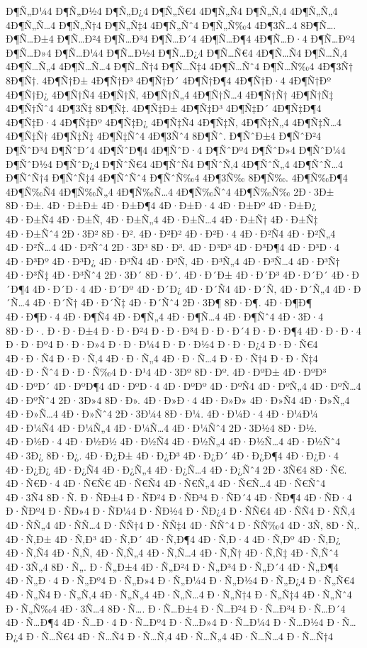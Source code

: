 {Ð¶Ñ„Ð¼4
Ð¶Ñ„Ð½4
Ð¶Ñ„Ð¿4
Ð¶Ñ„Ñ€4
4Ð¶Ñ„Ñ4
Ð¶Ñ„Ñ‚4
4Ð¶Ñ„Ñ„4
4Ð¶Ñ„Ñ…4
Ð¶Ñ„Ñ†4
Ð¶Ñ„Ñ‡4
4Ð¶Ñ„Ñˆ4
Ð¶Ñ„Ñ‰4
4Ð¶3Ñ…4
8Ð¶Ñ….
Ð¶Ñ…Ð±4
Ð¶Ñ…Ð²4
Ð¶Ñ…Ð³4
Ð¶Ñ…Ð´4
4Ð¶Ñ…Ð¶4
4Ð¶Ñ…Ð·4
Ð¶Ñ…Ðº4
Ð¶Ñ…Ð»4
Ð¶Ñ…Ð¼4
Ð¶Ñ…Ð½4
Ð¶Ñ…Ð¿4
Ð¶Ñ…Ñ€4
4Ð¶Ñ…Ñ4
Ð¶Ñ…Ñ‚4
4Ð¶Ñ…Ñ„4
4Ð¶Ñ…Ñ…4
Ð¶Ñ…Ñ†4
Ð¶Ñ…Ñ‡4
4Ð¶Ñ…Ñˆ4
Ð¶Ñ…Ñ‰4
4Ð¶3Ñ†
8Ð¶Ñ†.
4Ð¶Ñ†Ð±
4Ð¶Ñ†Ð³
4Ð¶Ñ†Ð´
4Ð¶Ñ†Ð¶4
4Ð¶Ñ†Ð·4
4Ð¶Ñ†Ðº
4Ð¶Ñ†Ð¿
4Ð¶Ñ†Ñ4
4Ð¶Ñ†Ñ‚
4Ð¶Ñ†Ñ„4
4Ð¶Ñ†Ñ…4
4Ð¶Ñ†Ñ†
4Ð¶Ñ†Ñ‡
4Ð¶Ñ†Ñˆ4
4Ð¶3Ñ‡
8Ð¶Ñ‡.
4Ð¶Ñ‡Ð±
4Ð¶Ñ‡Ð³
4Ð¶Ñ‡Ð´
4Ð¶Ñ‡Ð¶4
4Ð¶Ñ‡Ð·4
4Ð¶Ñ‡Ðº
4Ð¶Ñ‡Ð¿
4Ð¶Ñ‡Ñ4
4Ð¶Ñ‡Ñ‚
4Ð¶Ñ‡Ñ„4
4Ð¶Ñ‡Ñ…4
4Ð¶Ñ‡Ñ†
4Ð¶Ñ‡Ñ‡
4Ð¶Ñ‡Ñˆ4
4Ð¶3Ñˆ4
8Ð¶Ñˆ.
Ð¶ÑˆÐ±4
Ð¶ÑˆÐ²4
Ð¶ÑˆÐ³4
Ð¶ÑˆÐ´4
4Ð¶ÑˆÐ¶4
4Ð¶ÑˆÐ·4
Ð¶ÑˆÐº4
Ð¶ÑˆÐ»4
Ð¶ÑˆÐ¼4
Ð¶ÑˆÐ½4
Ð¶ÑˆÐ¿4
Ð¶ÑˆÑ€4
4Ð¶ÑˆÑ4
Ð¶ÑˆÑ‚4
4Ð¶ÑˆÑ„4
4Ð¶ÑˆÑ…4
Ð¶ÑˆÑ†4
Ð¶ÑˆÑ‡4
4Ð¶ÑˆÑˆ4
Ð¶ÑˆÑ‰4
4Ð¶3Ñ‰
8Ð¶Ñ‰.
4Ð¶Ñ‰Ð¶4
4Ð¶Ñ‰Ñ4
4Ð¶Ñ‰Ñ„4
4Ð¶Ñ‰Ñ…4
4Ð¶Ñ‰Ñˆ4
4Ð¶Ñ‰Ñ‰
2Ð·3Ð±
8Ð·Ð±.
4Ð·Ð±Ð±
4Ð·Ð±Ð¶4
4Ð·Ð±Ð·4
4Ð·Ð±Ðº
4Ð·Ð±Ð¿
4Ð·Ð±Ñ4
4Ð·Ð±Ñ‚
4Ð·Ð±Ñ„4
4Ð·Ð±Ñ…4
4Ð·Ð±Ñ†
4Ð·Ð±Ñ‡
4Ð·Ð±Ñˆ4
2Ð·3Ð²
8Ð·Ð².
4Ð·Ð²Ð²
4Ð·Ð²Ð·4
4Ð·Ð²Ñ4
4Ð·Ð²Ñ„4
4Ð·Ð²Ñ…4
4Ð·Ð²Ñˆ4
2Ð·3Ð³
8Ð·Ð³.
4Ð·Ð³Ð³
4Ð·Ð³Ð¶4
4Ð·Ð³Ð·4
4Ð·Ð³Ðº
4Ð·Ð³Ð¿
4Ð·Ð³Ñ4
4Ð·Ð³Ñ‚
4Ð·Ð³Ñ„4
4Ð·Ð³Ñ…4
4Ð·Ð³Ñ†
4Ð·Ð³Ñ‡
4Ð·Ð³Ñˆ4
2Ð·3Ð´
8Ð·Ð´.
4Ð·Ð´Ð±
4Ð·Ð´Ð³
4Ð·Ð´Ð´
4Ð·Ð´Ð¶4
4Ð·Ð´Ð·4
4Ð·Ð´Ðº
4Ð·Ð´Ð¿
4Ð·Ð´Ñ4
4Ð·Ð´Ñ‚
4Ð·Ð´Ñ„4
4Ð·Ð´Ñ…4
4Ð·Ð´Ñ†
4Ð·Ð´Ñ‡
4Ð·Ð´Ñˆ4
2Ð·3Ð¶
8Ð·Ð¶.
4Ð·Ð¶Ð¶
4Ð·Ð¶Ð·4
4Ð·Ð¶Ñ4
4Ð·Ð¶Ñ„4
4Ð·Ð¶Ñ…4
4Ð·Ð¶Ñˆ4
4Ð·3Ð·4
8Ð·Ð·.
Ð·Ð·Ð±4
Ð·Ð·Ð²4
Ð·Ð·Ð³4
Ð·Ð·Ð´4
Ð·Ð·Ð¶4
4Ð·Ð·Ð·4
Ð·Ð·Ðº4
Ð·Ð·Ð»4
Ð·Ð·Ð¼4
Ð·Ð·Ð½4
Ð·Ð·Ð¿4
Ð·Ð·Ñ€4
4Ð·Ð·Ñ4
Ð·Ð·Ñ‚4
4Ð·Ð·Ñ„4
4Ð·Ð·Ñ…4
Ð·Ð·Ñ†4
Ð·Ð·Ñ‡4
4Ð·Ð·Ñˆ4
Ð·Ð·Ñ‰4
Ð·Ð¹4
4Ð·3Ðº
8Ð·Ðº.
4Ð·ÐºÐ±
4Ð·ÐºÐ³
4Ð·ÐºÐ´
4Ð·ÐºÐ¶4
4Ð·ÐºÐ·4
4Ð·ÐºÐº
4Ð·ÐºÑ4
4Ð·ÐºÑ„4
4Ð·ÐºÑ…4
4Ð·ÐºÑˆ4
2Ð·3Ð»4
8Ð·Ð».
4Ð·Ð»Ð·4
4Ð·Ð»Ð»
4Ð·Ð»Ñ4
4Ð·Ð»Ñ„4
4Ð·Ð»Ñ…4
4Ð·Ð»Ñˆ4
2Ð·3Ð¼4
8Ð·Ð¼.
4Ð·Ð¼Ð·4
4Ð·Ð¼Ð¼
4Ð·Ð¼Ñ4
4Ð·Ð¼Ñ„4
4Ð·Ð¼Ñ…4
4Ð·Ð¼Ñˆ4
2Ð·3Ð½4
8Ð·Ð½.
4Ð·Ð½Ð·4
4Ð·Ð½Ð½
4Ð·Ð½Ñ4
4Ð·Ð½Ñ„4
4Ð·Ð½Ñ…4
4Ð·Ð½Ñˆ4
4Ð·3Ð¿
8Ð·Ð¿.
4Ð·Ð¿Ð±
4Ð·Ð¿Ð³
4Ð·Ð¿Ð´
4Ð·Ð¿Ð¶4
4Ð·Ð¿Ð·4
4Ð·Ð¿Ð¿
4Ð·Ð¿Ñ4
4Ð·Ð¿Ñ„4
4Ð·Ð¿Ñ…4
4Ð·Ð¿Ñˆ4
2Ð·3Ñ€4
8Ð·Ñ€.
4Ð·Ñ€Ð·4
4Ð·Ñ€Ñ€
4Ð·Ñ€Ñ4
4Ð·Ñ€Ñ„4
4Ð·Ñ€Ñ…4
4Ð·Ñ€Ñˆ4
4Ð·3Ñ4
8Ð·Ñ.
Ð·ÑÐ±4
Ð·ÑÐ²4
Ð·ÑÐ³4
Ð·ÑÐ´4
4Ð·ÑÐ¶4
4Ð·ÑÐ·4
Ð·ÑÐº4
Ð·ÑÐ»4
Ð·ÑÐ¼4
Ð·ÑÐ½4
Ð·ÑÐ¿4
Ð·ÑÑ€4
4Ð·ÑÑ4
Ð·ÑÑ‚4
4Ð·ÑÑ„4
4Ð·ÑÑ…4
Ð·ÑÑ†4
Ð·ÑÑ‡4
4Ð·ÑÑˆ4
Ð·ÑÑ‰4
4Ð·3Ñ‚
8Ð·Ñ‚.
4Ð·Ñ‚Ð±
4Ð·Ñ‚Ð³
4Ð·Ñ‚Ð´
4Ð·Ñ‚Ð¶4
4Ð·Ñ‚Ð·4
4Ð·Ñ‚Ðº
4Ð·Ñ‚Ð¿
4Ð·Ñ‚Ñ4
4Ð·Ñ‚Ñ‚
4Ð·Ñ‚Ñ„4
4Ð·Ñ‚Ñ…4
4Ð·Ñ‚Ñ†
4Ð·Ñ‚Ñ‡
4Ð·Ñ‚Ñˆ4
4Ð·3Ñ„4
8Ð·Ñ„.
Ð·Ñ„Ð±4
4Ð·Ñ„Ð²4
Ð·Ñ„Ð³4
Ð·Ñ„Ð´4
4Ð·Ñ„Ð¶4
4Ð·Ñ„Ð·4
Ð·Ñ„Ðº4
Ð·Ñ„Ð»4
Ð·Ñ„Ð¼4
Ð·Ñ„Ð½4
Ð·Ñ„Ð¿4
Ð·Ñ„Ñ€4
4Ð·Ñ„Ñ4
Ð·Ñ„Ñ‚4
4Ð·Ñ„Ñ„4
4Ð·Ñ„Ñ…4
Ð·Ñ„Ñ†4
Ð·Ñ„Ñ‡4
4Ð·Ñ„Ñˆ4
Ð·Ñ„Ñ‰4
4Ð·3Ñ…4
8Ð·Ñ….
Ð·Ñ…Ð±4
Ð·Ñ…Ð²4
Ð·Ñ…Ð³4
Ð·Ñ…Ð´4
4Ð·Ñ…Ð¶4
4Ð·Ñ…Ð·4
Ð·Ñ…Ðº4
Ð·Ñ…Ð»4
Ð·Ñ…Ð¼4
Ð·Ñ…Ð½4
Ð·Ñ…Ð¿4
Ð·Ñ…Ñ€4
4Ð·Ñ…Ñ4
Ð·Ñ…Ñ‚4
4Ð·Ñ…Ñ„4
4Ð·Ñ…Ñ…4
Ð·Ñ…Ñ†4
}
